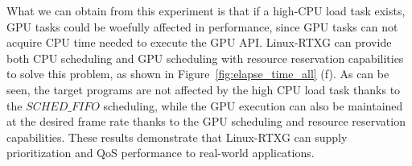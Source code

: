 What we can obtain from this experiment is that if a high-CPU load task
exists, GPU tasks could be woefully affected in performance, since GPU
tasks can not acquire CPU time needed to execute the GPU API.
Linux-RTXG can provide both CPU scheduling and GPU scheduling with
resource reservation capabilities to solve this problem, as shown in
Figure~\ref{fig:elapse_time_all} (f).
As can be seen, the target programs are not affected by the high CPU
load task thanks to the $SCHED\_FIFO$ scheduling, while the GPU
execution can also be maintained at the desired frame rate thanks to the
GPU scheduling and resource reservation capabilities.
These results demonstrate that Linux-RTXG can supply prioritization and
QoS performance to real-world applications.

